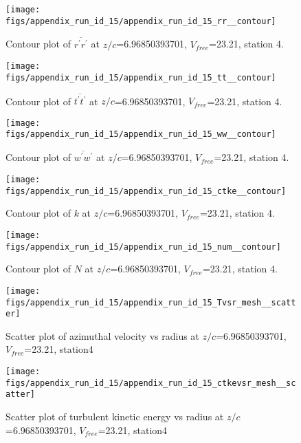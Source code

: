 \begin{figure}[H]
\centering
\texttt{[image: figs/appendix\_run\_id\_15/appendix\_run\_id\_15\_rr\_\_contour]}
\caption{Contour plot of $\overline{r^\prime r^\prime}$ at $z/c$=6.96850393701, $V_{free}$=23.21, station 4.}
\label{fig:appendix_run_id_15_rr__contour}
\end{figure}


\begin{figure}[H]
\centering
\texttt{[image: figs/appendix\_run\_id\_15/appendix\_run\_id\_15\_tt\_\_contour]}
\caption{Contour plot of $\overline{t^\prime t^\prime}$ at $z/c$=6.96850393701, $V_{free}$=23.21, station 4.}
\label{fig:appendix_run_id_15_tt__contour}
\end{figure}


\begin{figure}[H]
\centering
\texttt{[image: figs/appendix\_run\_id\_15/appendix\_run\_id\_15\_ww\_\_contour]}
\caption{Contour plot of $\overline{w^\prime w^\prime}$ at $z/c$=6.96850393701, $V_{free}$=23.21, station 4.}
\label{fig:appendix_run_id_15_ww__contour}
\end{figure}


\begin{figure}[H]
\centering
\texttt{[image: figs/appendix\_run\_id\_15/appendix\_run\_id\_15\_ctke\_\_contour]}
\caption{Contour plot of $k$ at $z/c$=6.96850393701, $V_{free}$=23.21, station 4.}
\label{fig:appendix_run_id_15_ctke__contour}
\end{figure}


\begin{figure}[H]
\centering
\texttt{[image: figs/appendix\_run\_id\_15/appendix\_run\_id\_15\_num\_\_contour]}
\caption{Contour plot of $N$ at $z/c$=6.96850393701, $V_{free}$=23.21, station 4.}
\label{fig:appendix_run_id_15_num__contour}
\end{figure}


\begin{figure}[H]
\centering
\texttt{[image: figs/appendix\_run\_id\_15/appendix\_run\_id\_15\_Tvsr\_mesh\_\_scatter]}
\caption{Scatter plot of azimuthal velocity vs radius at $z/c$=6.96850393701, $V_{free}$=23.21, station4}
\label{fig:appendix_run_id_15_Tvsr_mesh__scatter}
\end{figure}


\begin{figure}[H]
\centering
\texttt{[image: figs/appendix\_run\_id\_15/appendix\_run\_id\_15\_ctkevsr\_mesh\_\_scatter]}
\caption{Scatter plot of turbulent kinetic energy vs radius at $z/c$=6.96850393701, $V_{free}$=23.21, station4}
\label{fig:appendix_run_id_15_ctkevsr_mesh__scatter}
\end{figure}


